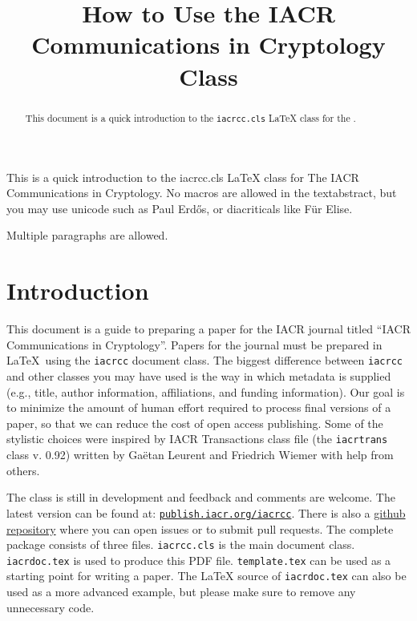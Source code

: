 \documentclass{iacrcc}
\title[running  = {The iacrcc class},
       subtitle = {iacrcc LaTeX Class Documentation (v0.48)}
      ]{How to Use the IACR Communications in Cryptology Class}
\begin{document}
\maketitle


\begin{abstract}
  This document is a quick introduction to the \texttt{iacrcc.cls}
  \LaTeX{} class for the \publname{}.
\end{abstract}

\begin{textabstract}
This is a quick introduction to the iacrcc.cls LaTeX class for
The IACR Communications in Cryptology. No macros are allowed in
the textabstract, but you may use unicode such as Paul Erdős, or
diacriticals like F\"ur Elise.

Multiple paragraphs are allowed.
\end{textabstract}

\section*{Introduction}

This document is a guide to preparing a paper for the IACR journal
titled ``IACR Communications in Cryptology''.  Papers for the journal
must be prepared in \LaTeX\ using the \texttt{iacrcc} document
class. The biggest difference between \texttt{iacrcc} and other
classes you may have used is the way in which metadata is supplied
(e.g., title, author information, affiliations, and funding
information). Our goal is to minimize the amount of human effort
required to process final versions of a paper, so that we can reduce
the cost of open access publishing.  Some of the stylistic choices
were inspired by IACR Transactions class file (the \texttt{iacrtrans}
class v. 0.92) written by Ga{\"e}tan Leurent and Friedrich Wiemer with
help from others.

The class is still in development and feedback and comments are
welcome.  The latest version can be found at:
\href{https://publish.iacr.org/iacrcc}{\texttt{publish.iacr.org/iacrcc}}.
There is also a \href{https://github.com/IACR/latex}{github
  repository} where you can open issues or to submit pull requests.
The complete package consists of three files. \texttt{iacrcc.cls} is
the main document class. \texttt{iacrdoc.tex} is used to produce this PDF
file. \texttt{template.tex} can be used as a starting point for
writing a paper.  The \LaTeX{} source of \texttt{iacrdoc.tex} can also
be used as a more advanced example, but please make sure to remove any
unnecessary code.
\end{document}
